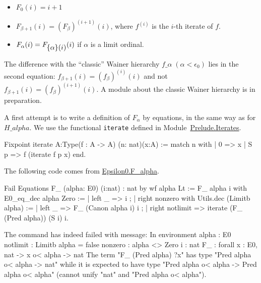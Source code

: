 \label{F_equations}
\begin{itemize}
\item $F_0(i)=i+1$
\item $F_{\beta+1}(i)= (F_\beta)^{(i+1)}(i)$, where $f^{(i)}$ is the $i$-th iterate of $f$.
\item $F_\alpha(i) = F_{\mbox{$\{\alpha\}(i)$}} (i)$ if $\alpha$ is a limit ordinal.
\end{itemize}

\begin{remark}
The difference with the ``classic'' Wainer hierarchy 
$f\_\alpha\;(\alpha<\epsilon_0)$ lies in the second equation:
$f_{\beta+1}(i) = (f_\beta)^{(i)}(i)$ and not
$f_{\beta+1}(i) = (f_\beta)^{(i+1)}(i)$. A module about 
the classic Wainer hierarchy is in preparation.
\end{remark}

A first attempt is to write a definition of $F_\alpha$ by equations, in the same way as for $H\_alpha$.  We use the functional \texttt{iterate} defined in 
Module~\href{../theories/html/hydras.Prelude.Iterates.html\#iterate}{Prelude.Iterates}.

\begin{Coqsrc}
Fixpoint iterate {A:Type}(f : A -> A) (n: nat)(x:A) :=
  match n with
  | 0 => x
  | S p => f (iterate  f p x)
  end.
\end{Coqsrc}

The following code comes from 
 \href{../theories/html/hydras.Epsilon0.F_alpha.html}{Epsilon0.F\_alpha}.



\begin{Coqsrc}
Fail Equations F_ (alpha: E0) (i:nat) :  nat  by wf  alpha Lt :=
  F_ alpha  i with E0_eq_dec alpha Zero :=
    { | left _ =>  i ;
      | right nonzero
          with Utils.dec (Limitb alpha) :=
          { | left _ =>  F_ (Canon alpha i)  i ;
            | right notlimit =>  iterate (F_ (Pred alpha))  (S i) i}}.
\end{Coqsrc}

\begin{Coqanswer}
The command has indeed failed with message:
In environment
alpha : E0
notlimit : Limitb alpha = false
nonzero : alpha <> Zero
i : nat
F_ : forall x : E0, nat -> x o< alpha -> nat
The term "F_ (Pred alpha) ?x" has type "Pred alpha o< alpha -> nat"
while it is expected to have type 
"Pred alpha o< alpha -> Pred alpha o< alpha"
(cannot unify "nat" and "Pred alpha o< alpha").
\end{Coqanswer}


